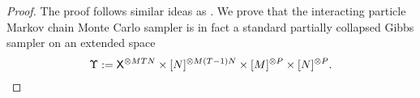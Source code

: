 \begin{proof}
	The proof follows similar ideas as \citet{andrieuDH2010}. We prove that the interacting particle Markov chain Monte Carlo sampler is in fact a standard partially collapsed Gibbs sampler \citep{van2008partially} on an extended space \[
	{\Upsilon := \mathsf{X}^{\otimes MTN} \times [N]^{\otimes M(T-1)N} \times [M]^{\otimes P} \times [N]^{\otimes P}}.
	\]

\end{proof}
